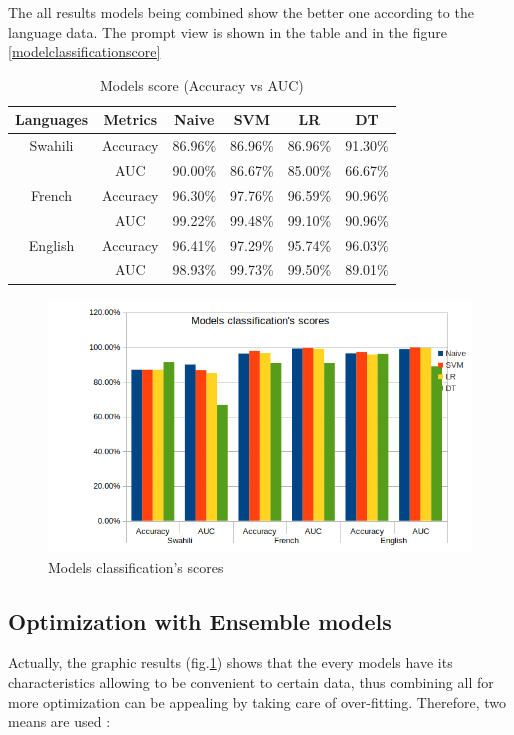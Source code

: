 \documentclass[12pt,a4paper, oneside]{book}
\begin{document}
The all results models being combined show the better one according to the language data. The prompt view is shown in the table and in the figure \ref{modelclassificationscore}
\begin{table}[h]
\centering
\begin{tabular}{cccccc}
	\hline 
	\hline
	Languages& Metrics  & Naive & SVM  & LR & DT   \\
	\hline
	\hline
	Swahili  &	Accuracy &	86.96\% &	86.96\% &	86.96\% &	91.30\%\\
	
	& AUC	&90.00\%	& 86.67\%	& 85.00\%	&66.67\% \\
			
	French	& Accuracy& 	96.30\% & 	97.76\% & 	96.59\% & 	90.96\% \\
			 & 	AUC & 	99.22\% & 	99.48\%	& 99.10\%& 	90.96\% \\
	English &	Accuracy&	96.41\%&	97.29\%	&95.74\%	&96.03\% \\
	
	& AUC	& 98.93\% &	99.73\%	& 99.50\% &	89.01\%	\\	
	\hline		
	\hline
\end{tabular}
\caption{Models score (Accuracy vs AUC)}

\end{table}

\begin{figure}[h]
	\centering
	\includegraphics[width=1\linewidth]{CollectImages/modelClassificationScore}
	\caption{Models classification's scores}
	\label{fig:modelclassificationscore}
\end{figure} 
\subsection{Optimization with Ensemble models}
Actually, the graphic results (fig.\ref{fig:modelclassificationscore}) shows that the every models have its characteristics allowing to be convenient to certain data, thus combining all for more optimization can be appealing by taking care of over-fitting. Therefore, two means are used :\\
\end{document}
